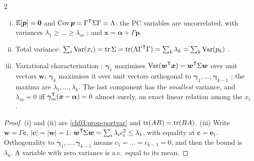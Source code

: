 \begin{paracol}{2}
\begin{proposition}\label{ch03:prop-pca}
\leavevmode
\begin{enumerate}[(i)]
  \item $\mathbb{E}[\bm p]=\bm0$ and $\operatorname{Cov}\bm p=\Gamma^{\mathsf T}\Sigma\Gamma=\Lambda$: the PC variables are uncorrelated, with variances
        $\lambda_1\ge\dots\ge\lambda_m$ ; and $\bm x=\bm\alpha+\Gamma\bm p$.
  \item Total variance: $\sum_i\operatorname{Var}(x_i)=\operatorname{tr}\Sigma=\operatorname{tr}(\Lambda\Gamma^{\mathsf T}\Gamma)=\sum_k\lambda_k=\sum_k\operatorname{Var}(p_k)$ .
  \item Variational characterisation : $\bm\gamma_1$ maximises $\operatorname{Var}(\bm w^{\mathsf T}\bm x)=\bm w^{\mathsf T}\Sigma\bm w$ over unit vectors
        $\bm w$; $\bm\gamma_k$ maximises it over unit vectors orthogonal to $\bm\gamma_1,\dots,\bm\gamma_{k-1}$ ; the
        maxima are $\lambda_1,\dots,\lambda_k$. The last component has the \emph{smallest} variance, and $\lambda_m=0$ iff
        $\bm\gamma_m^{\mathsf T}(\bm x-\bm\alpha)=0$ almost surely, an exact linear relation among the $x_i$.
\end{enumerate}
\end{proposition}
\begin{proof}
(i) and (ii) are \cref{ch03:prop-portvar} and $\operatorname{tr}(AB)=\operatorname{tr}(BA)$. (iii) Write $\bm w=\Gamma\bm c$, $|\bm c|=|\bm w|=1$:
$\bm w^{\mathsf T}\Sigma\bm w=\sum_i\lambda_ic_i^2\le\lambda_1$, with equality at $\bm c=\bm e_1$. Orthogonality to $\bm\gamma_1,\dots,\bm\gamma_{k-1}$
means $c_1=\dots=c_{k-1}=0$, and then the bound is $\lambda_k$. A variable with zero variance is a.s.\ equal to its mean.
\end{proof}


\end{paracol}
